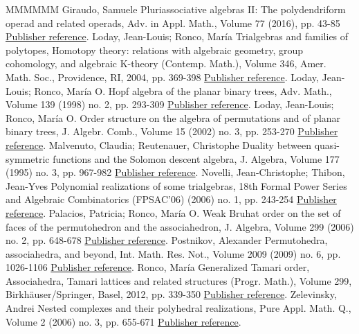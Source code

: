 \begin{thebibliography}{MMMMMM}
 Giraudo, Samuele Pluriassociative algebras II: The polydendriform operad and related operads, Adv. in Appl. Math., Volume 77 (2016), pp. 43-85 \href{https://alco.centre-mersenne.org/articles/10.5802/alco.401/#Samuele}{Publisher reference}.
 Loday, Jean-Louis; Ronco, María Trialgebras and families of polytopes, Homotopy theory: relations with algebraic geometry, group cohomology, and algebraic K-theory (Contemp. Math.), Volume 346, Amer. Math. Soc., Providence, RI, 2004, pp. 369-398 \href{https://alco.centre-mersenne.org/articles/10.5802/alco.401/#LR}{Publisher reference}.
 Loday, Jean-Louis; Ronco, María O. Hopf algebra of the planar binary trees, Adv. Math., Volume 139 (1998) no. 2, pp. 293-309 \href{https://alco.centre-mersenne.org/articles/10.5802/alco.401/#LR-planar-Hopf}{Publisher reference}.
 Loday, Jean-Louis; Ronco, María O. Order structure on the algebra of permutations and of planar binary trees, J. Algebr. Comb., Volume 15 (2002) no. 3, pp. 253-270 \href{https://alco.centre-mersenne.org/articles/10.5802/alco.401/#LR02}{Publisher reference}.
 Malvenuto, Claudia; Reutenauer, Christophe Duality between quasi-symmetric functions and the Solomon descent algebra, J. Algebra, Volume 177 (1995) no. 3, pp. 967-982 \href{https://alco.centre-mersenne.org/articles/10.5802/alco.401/#MalvReut}{Publisher reference}.
 Novelli, Jean-Christophe; Thibon, Jean-Yves Polynomial realizations of some trialgebras, 18th Formal Power Series and Algebraic Combinatorics (FPSAC’06) (2006) no. 1, pp. 243-254 \href{https://alco.centre-mersenne.org/articles/10.5802/alco.401/#HNT}{Publisher reference}.
 Palacios, Patricia; Ronco, María O. Weak Bruhat order on the set of faces of the permutohedron and the associahedron, J. Algebra, Volume 299 (2006) no. 2, pp. 648-678 \href{https://alco.centre-mersenne.org/articles/10.5802/alco.401/#PalaciosRonco}{Publisher reference}.
 Postnikov, Alexander Permutohedra, associahedra, and beyond, Int. Math. Res. Not., Volume 2009 (2009) no. 6, pp. 1026-1106 \href{https://alco.centre-mersenne.org/articles/10.5802/alco.401/#P09}{Publisher reference}.
 Ronco, María Generalized Tamari order, Associahedra, Tamari lattices and related structures (Progr. Math.), Volume 299, Birkhäuser/Springer, Basel, 2012, pp. 339-350 \href{https://alco.centre-mersenne.org/articles/10.5802/alco.401/#RoncoGTO}{Publisher reference}.
 Zelevinsky, Andrei Nested complexes and their polyhedral realizations, Pure Appl. Math. Q., Volume 2 (2006) no. 3, pp. 655-671 \href{https://alco.centre-mersenne.org/articles/10.5802/alco.401/#Zel06}{Publisher reference}.
\end{thebibliography}
